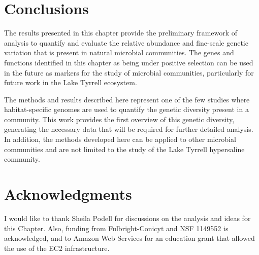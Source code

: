 \section{Conclusions}

The results presented in this chapter provide the preliminary framework of analysis to quantify and evaluate the relative abundance and fine-scale genetic variation that is present in natural microbial communities. The genes and functions identified in this chapter as being under positive selection can be used in the future as markers for the study of microbial communities, particularly for future work in the Lake Tyrrell ecosystem.

The methods and results described here represent one of the few studies where habitat-specific genomes are used to quantify the genetic diversity present in a community. This work provides the first overview of this genetic diversity, generating the necessary data that will be required for further detailed analysis. In addition, the methods developed here can be applied to other microbial communities and are not limited to the study of the Lake Tyrrell hypersaline community.

\section{Acknowledgments}
I would like to thank Sheila Podell for discussions on the analysis and ideas for this Chapter. Also, funding from Fulbright-Conicyt and NSF 1149552 is acknowledged, and to Amazon Web Services for an education grant that allowed the use of the EC2 infrastructure.




